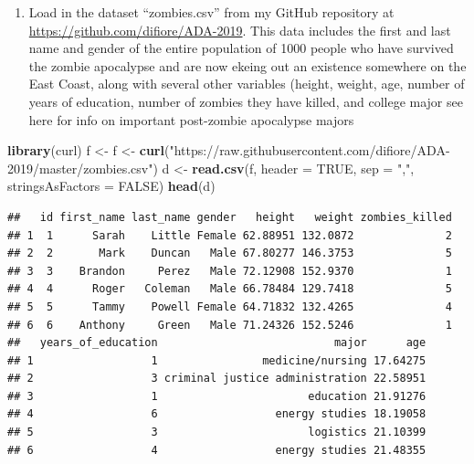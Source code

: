 \documentclass[]{article}
\newenvironment{Shaded}{\begin{snugshade}}{\end{snugshade}}
\newcommand{\KeywordTok}[1]{\textcolor[rgb]{0.13,0.29,0.53}{\textbf{#1}}}
\newcommand{\DataTypeTok}[1]{\textcolor[rgb]{0.13,0.29,0.53}{#1}}
\newcommand{\StringTok}[1]{\textcolor[rgb]{0.31,0.60,0.02}{#1}}
\newcommand{\OtherTok}[1]{\textcolor[rgb]{0.56,0.35,0.01}{#1}}
\newcommand{\NormalTok}[1]{#1}
\providecommand{\tightlist}{%
  \setlength{\itemsep}{0pt}\setlength{\parskip}{0pt}}
\begin{document}
\begin{enumerate}
\def\labelenumi{\arabic{enumi}.}
\setcounter{enumi}{1}
\tightlist
\item
  Load in the dataset ``zombies.csv'' from my GitHub repository at
  \url{https://github.com/difiore/ADA-2019}. This data includes the
  first and last name and gender of the entire population of 1000 people
  who have survived the zombie apocalypse and are now ekeing out an
  existence somewhere on the East Coast, along with several other
  variables (height, weight, age, number of years of education, number
  of zombies they have killed, and college major see here for info on
  important post-zombie apocalypse majors
\end{enumerate}

\begin{Shaded}
\begin{Highlighting}[]
\KeywordTok{library}\NormalTok{(curl)}
\NormalTok{f <-}\StringTok{ }\NormalTok{f <-}\StringTok{ }\KeywordTok{curl}\NormalTok{(}\StringTok{"https://raw.githubusercontent.com/difiore/ADA-2019/master/zombies.csv"}\NormalTok{)}
\NormalTok{d <-}\StringTok{ }\KeywordTok{read.csv}\NormalTok{(f, }\DataTypeTok{header =} \OtherTok{TRUE}\NormalTok{, }\DataTypeTok{sep =} \StringTok{","}\NormalTok{, }\DataTypeTok{stringsAsFactors =} \OtherTok{FALSE}\NormalTok{)}
\KeywordTok{head}\NormalTok{(d)}
\end{Highlighting}
\end{Shaded}

\begin{verbatim}
##   id first_name last_name gender   height   weight zombies_killed
## 1  1      Sarah    Little Female 62.88951 132.0872              2
## 2  2       Mark    Duncan   Male 67.80277 146.3753              5
## 3  3    Brandon     Perez   Male 72.12908 152.9370              1
## 4  4      Roger   Coleman   Male 66.78484 129.7418              5
## 5  5      Tammy    Powell Female 64.71832 132.4265              4
## 6  6    Anthony     Green   Male 71.24326 152.5246              1
##   years_of_education                           major      age
## 1                  1                medicine/nursing 17.64275
## 2                  3 criminal justice administration 22.58951
## 3                  1                       education 21.91276
## 4                  6                  energy studies 18.19058
## 5                  3                       logistics 21.10399
## 6                  4                  energy studies 21.48355
\end{verbatim}
\end{document}
